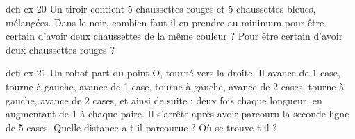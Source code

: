 \begin{blocEdition}{defi-ex-20}
Un tiroir contient 5 chaussettes rouges et 5 chaussettes bleues, mélangées. Dans le noir, combien faut-il en prendre au minimum pour être certain d’avoir deux chaussettes de la même couleur ? Pour être certain d’avoir deux chaussettes rouges ?\par{}\par\par{}\par{}\par{}\par{}\par{}\par{}
\end{blocEdition}
\begin{blocEdition}{defi-ex-21}
Un robot part du point O, tourné vers la droite. Il avance de 1 case, tourne à gauche, avance de 1 case, tourne à gauche, avance de 2 cases, tourne à gauche, avance de 2 cases, et ainsi de suite : deux fois chaque longueur, en augmentant de 1 à chaque paire. Il s’arrête après avoir parcouru la seconde ligne de 5 cases. Quelle distance a-t-il parcourue ? Où se trouve-t-il ?\label{fig-defi-21}
\par{}\par\par{}\par{}\par{}\par{}\par{}\par{}
\end{blocEdition}
